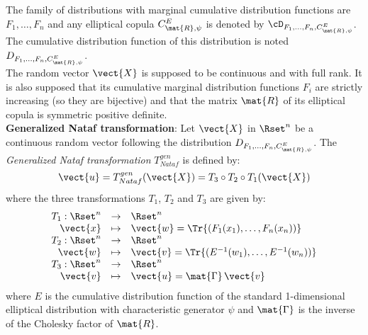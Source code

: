 {  The family of distributions with marginal cumulative distribution functions are $F_1,\dots,F_n$ and any elliptical copula $C^E_{\mat{R},\psi}$ is denoted by ${\cD}_{F_1,\dots,F_n,C^E_{\mat{R},\psi}}$. The cumulative distribution function of this distribution is noted $D_{F_1,\dots,F_n,C^E_{\mat{R},\psi}}$.\\

  The random vector $\vect{X}$ is supposed to be continuous and with full rank. It is also supposed that its cumulative marginal distribution functions $F_i$  are strictly increasing (so they are bijective) and that the matrix $\mat{R}$ of its elliptical copula is symmetric positive definite.\\

  {\bf Generalized Nataf transformation}:   Let $\vect{X}$ in $\Rset^n$ be a continuous random vector following the distribution $D_{F_1,\dots,F_n,C^E_{\mat{R},\psi}}$. The \emph{Generalized Nataf transformation} $T_{Nataf}^{gen}$ is defined by:
  \begin{equation}
    \vect{u} = T_{Nataf}^{gen}(\vect{X})=T_3\circ T_2\circ T_1(\vect{X})
  \end{equation}
  where the three transformations $T_1$, $T_2$ and $T_3$ are given by:
  \begin{equation}
    \begin{array}{l}
      \begin{array}{rcl}
        T_1 : \Rset^n & \rightarrow & \Rset^n\\
        \vect{x} & \mapsto & \vect{w}=\Tr{(F_1(x_1),\dots,F_n(x_n))}
      \end{array}\\
      \begin{array}{rcl}
        T_2 : \Rset^n & \rightarrow & \Rset^n\\
        \vect{w} & \mapsto & \vect{v}=\Tr{(E^{-1}(w_1),\dots,E^{-1}(w_n))}
      \end{array}\\
      \begin{array}{rcl}
        T_3 : \Rset^n & \rightarrow & \Rset^n\\
        \vect{v} & \mapsto & \vect{u}=\mat{\Gamma}\,\vect{v}
      \end{array}
    \end{array}
  \end{equation}
  where $E$ is the cumulative distribution function of the standard 1-dimensional elliptical distribution with characteristic generator $\psi$ and $\mat{\Gamma}$ is the inverse of the Cholesky factor of $\mat{R}$.\\

}
